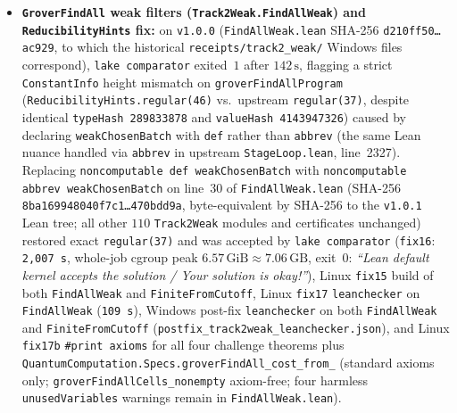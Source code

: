 \documentclass[11pt,a4paper]{article}
\theoremstyle{definition}
\theoremstyle{remark}
\begin{document}
\begin{itemize}
\item \textbf{\texttt{GroverFindAll} weak filters (\texttt{Track2Weak.\allowbreak FindAllWeak}) and \texttt{Reducibility\allowbreak Hints} fix:} on \texttt{v1.0.0} (\texttt{FindAll\allowbreak Weak.lean} SHA-256 \texttt{d210ff50\ldots ac929}, to which the historical \texttt{receipts/\allowbreak track2\_weak/} Windows files correspond), \texttt{lake comparator} exited~\(1\) after \(142\,\mathrm{s}\), flagging a strict \texttt{Constant\allowbreak Info} height mismatch on \texttt{groverFindAll\allowbreak Program} (\texttt{Reducibility\allowbreak Hints.\allowbreak regular(46)} vs.\ upstream \texttt{regular(37)}, despite identical \texttt{typeHash}~\texttt{289833878} and \texttt{valueHash}~\texttt{4143947326}) caused by declaring \texttt{weakChosen\allowbreak Batch} with \texttt{def} rather than \texttt{abbrev} (the same Lean nuance handled via \texttt{abbrev} in upstream \texttt{Stage\allowbreak Loop.lean}, line~2327). Replacing \texttt{noncomputable def weakChosen\allowbreak Batch} with \texttt{noncomputable abbrev weakChosen\allowbreak Batch} on line~30 of \texttt{FindAll\allowbreak Weak.lean} (SHA-256 \texttt{8ba16994\allowbreak 8040f7c1\ldots 470bdd9a}, byte-equivalent by SHA-256 to the \texttt{v1.0.1} Lean tree; all other \(110\) \texttt{Track2\allowbreak Weak} modules and certificates unchanged) restored exact \texttt{regular(37)} and was accepted by \texttt{lake comparator} (\texttt{fix16}: \texttt{2,007\,s}, whole-job cgroup peak \(6.57\,\mathrm{GiB} \approx 7.06\,\mathrm{GB}\), exit~\(0\): \emph{``Lean default kernel accepts the solution / Your solution is okay!''}), Linux \texttt{fix15} build of both \texttt{FindAll\allowbreak Weak} and \texttt{Finite\allowbreak FromCutoff}, Linux \texttt{fix17} \texttt{leanchecker} on \texttt{FindAll\allowbreak Weak} (\texttt{109\,s}), Windows post-fix \texttt{leanchecker} on both \texttt{FindAll\allowbreak Weak} and \texttt{Finite\allowbreak FromCutoff} (\texttt{postfix\_\allowbreak track2weak\_\allowbreak leanchecker.json}), and Linux \texttt{fix17b} \texttt{\#print axioms} for all four challenge theorems plus \texttt{Quantum\allowbreak Computation.\allowbreak Specs.\allowbreak groverFindAll\_\allowbreak cost\_\allowbreak from\_} (standard axioms only; \texttt{groverFindAll\allowbreak Cells\_\allowbreak nonempty} axiom-free; four harmless \texttt{unused\allowbreak Variables} warnings remain in \texttt{FindAll\allowbreak Weak.lean}).
\end{itemize}
\end{document}
